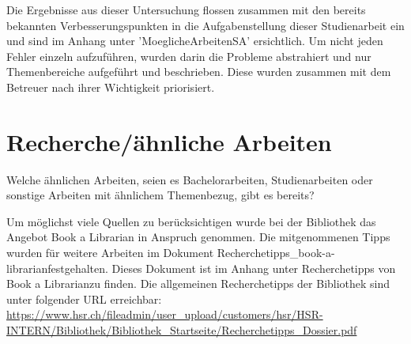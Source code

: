 Die Ergebnisse aus dieser Untersuchung flossen zusammen mit den bereits bekannten Verbesserungspunkten in die Aufgabenstellung dieser Studienarbeit ein und sind im Anhang unter 'MoeglicheArbeitenSA' ersichtlich. Um nicht jeden Fehler einzeln aufzuführen, wurden darin die Probleme abstrahiert und nur Themenbereiche aufgeführt und beschrieben. Diese wurden zusammen mit dem Betreuer nach ihrer Wichtigkeit priorisiert.

\newpage

\section{Recherche/ähnliche Arbeiten}
\label{sec:rechercheAehnlicheArbeiten}

Welche ähnlichen Arbeiten, seien es Bachelorarbeiten, Studienarbeiten oder sonstige Arbeiten mit ähnlichem Themenbezug, gibt es bereits?

Um möglichst viele Quellen zu berücksichtigen wurde bei der Bibliothek das Angebot \glqq Book a Librarian\grqq \cite{hsr_book_a_librarian} in Anspruch genommen. Die mitgenommenen Tipps wurden für weitere Arbeiten im Dokument \glqq Recherchetipps\_book-a-librarian\grqq festgehalten. Dieses Dokument ist im Anhang unter \glqq Recherchetipps von Book a Librarian\grqq zu finden. Die allgemeinen Recherchetipps der Bibliothek sind unter folgender URL erreichbar: \url{https://www.hsr.ch/fileadmin/user_upload/customers/hsr/HSR-INTERN/Bibliothek/Bibliothek_Startseite/Recherchetipps_Dossier.pdf}

